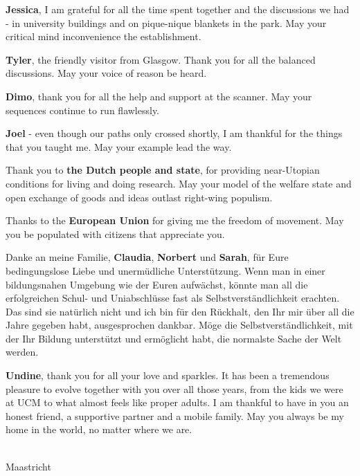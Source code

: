 \textbf{Jessica}, I am grateful for all the time spent together and the discussions we had - in university buildings and on pique-nique blankets in the park. May your critical mind inconvenience the establishment.

\textbf{Tyler}, the friendly visitor from Glasgow. Thank you for all the balanced discussions. May your voice of reason be heard.

\textbf{Dimo}, thank you for all the help and support at the scanner. May your sequences continue to run flawlessly. 

\textbf{Joel} - even though our paths only crossed shortly, I am thankful for the things that you taught me. May your example lead the way.

Thank you to \textbf{the Dutch people and state}, for providing near-Utopian conditions for living and doing research. May your model of the welfare state and open exchange of goods and ideas outlast right-wing populism.

Thanks to the \textbf{European Union} for giving me the freedom of movement. May you be populated with citizens that appreciate you.

Danke an meine Familie, \textbf{Claudia}, \textbf{Norbert} und \textbf{Sarah}, für Eure bedingungslose Liebe und unermüdliche Unterstützung. Wenn man in einer bildungsnahen Umgebung wie der Euren aufwächst, könnte man all die erfolgreichen Schul- und Uniabschlüsse fast als Selbstverständlichkeit erachten. Das sind sie natürlich nicht und ich bin für den Rückhalt, den Ihr mir über all die Jahre gegeben habt, ausgesprochen dankbar. Möge die Selbstverständlichkeit, mit der Ihr Bildung unterstützt und ermöglicht habt, die normalste Sache der Welt werden.

\textbf{Undine}, thank you for all your love and sparkles. It has been a tremendous pleasure to evolve together with you over all those years, from the kids we were at UCM to what almost feels like proper adults. I am thankful to have in you an honest friend, a supportive partner and a mobile family. May you always be my home in the world, no matter where we are.

{\flushright \thesisauthor \\ Maastricht \\ \thesisdate \\ }